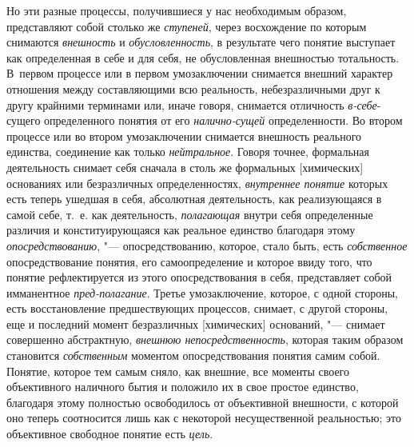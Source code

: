 Но эти разные процессы, получившиеся у нас необходимым
образом, представляют собой столько же
{\em ступеней}, через
восхождение по которым снимаются
{\em внешность} и
{\em обусловленность}, в
результате чего понятие выступает как определенная в себе и для себя, не
обусловленная внешностью тотальность. В~первом процессе или в первом
умозаключении снимается внешний характер отношения между составляющими всю
реальность, небезразличными друг к другу крайними терминами или, иначе
говоря, снимается отличность
{\em в-себе}-сущего
определенного понятия от его
{\em налично-сущей}
определенности. Во втором процессе или во втором
умозаключении снимается внешность реального единства, соединение как только
{\em нейтральное}. Говоря
точнее, формальная деятельность снимает себя сначала в столь же формальных
[химических] основаниях или безразличных определенностях,
{\em внутреннее понятие}
которых есть теперь ушедшая в себя, абсолютная деятельность,
как реализующаяся в самой себе, т.~е. как деятельность,
{\em полагающая} внутри
себя определенные различия и конституирующаяся как реальное единство
благодаря этому {\em опосредствованию},
"--- опосредствованию, которое, стало быть, есть
{\em собственное}
опосредствование понятия, его самоопределение и которое ввиду
того, что понятие рефлектируется из этого опосредствования в себя,
представляет собой имманентное
{\em пред-полагание}.
Третье умозаключение, которое, с одной стороны, есть
восстановление предшествующих процессов, снимает, с другой стороны, еще и
последний момент безразличных [химических] оснований, "---
снимает совершенно абстрактную,
{\em внешнюю непосредственность},
которая таким образом становится
{\em собственным}
моментом опосредствования понятия самим собой. Понятие,
которое тем самым сняло, как внешние, все моменты своего объективного
наличного бытия и положило их в свое простое единство, благодаря этому
полностью освободилось от объективной внешности, с которой оно теперь
соотносится лишь как с некоторой несущественной реальностью; это
объективное свободное понятие есть
{\em цель}.

